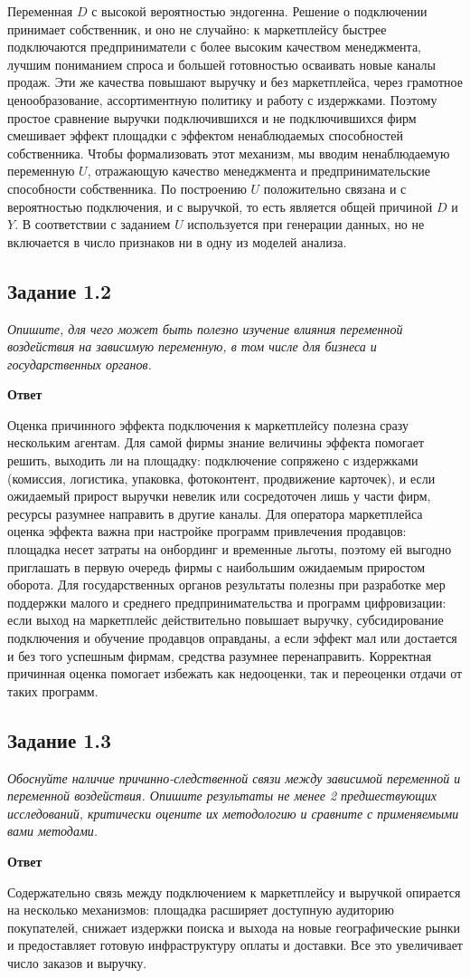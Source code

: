 \documentclass[12pt,a4paper]{article}
\newcommand{\zadanie}[2]{\subsection*{Задание #1}\begingroup\itshape #2\par\endgroup\medskip}
\newcommand{\otvet}{\par\noindent\textbf{Ответ}\par\medskip}
\begin{document}
Переменная $D$ с высокой вероятностью эндогенна. Решение о подключении принимает собственник, и оно не случайно: к маркетплейсу быстрее подключаются предприниматели с более высоким качеством менеджмента, лучшим пониманием спроса и большей готовностью осваивать новые каналы продаж. Эти же качества повышают выручку и без маркетплейса, через грамотное ценообразование, ассортиментную политику и работу с издержками. Поэтому простое сравнение выручки подключившихся и не подключившихся фирм смешивает эффект площадки с эффектом ненаблюдаемых способностей собственника. Чтобы формализовать этот механизм, мы вводим ненаблюдаемую переменную $U$, отражающую качество менеджмента и предпринимательские способности собственника. По построению $U$ положительно связана и с вероятностью подключения, и с выручкой, то есть является общей причиной $D$ и $Y$. В соответствии с заданием $U$ используется при генерации данных, но не включается в число признаков ни в одну из моделей анализа.

\zadanie{1.2}{Опишите, для чего может быть полезно изучение влияния переменной воздействия на зависимую переменную, в том числе для бизнеса и государственных органов.}
\otvet
Оценка причинного эффекта подключения к маркетплейсу полезна сразу нескольким агентам. Для самой фирмы знание величины эффекта помогает решить, выходить ли на площадку: подключение сопряжено с издержками (комиссия, логистика, упаковка, фотоконтент, продвижение карточек), и если ожидаемый прирост выручки невелик или сосредоточен лишь у части фирм, ресурсы разумнее направить в другие каналы. Для оператора маркетплейса оценка эффекта важна при настройке программ привлечения продавцов: площадка несет затраты на онбординг и временные льготы, поэтому ей выгодно приглашать в первую очередь фирмы с наибольшим ожидаемым приростом оборота. Для государственных органов результаты полезны при разработке мер поддержки малого и среднего предпринимательства и программ цифровизации: если выход на маркетплейс действительно повышает выручку, субсидирование подключения и обучение продавцов оправданы, а если эффект мал или достается и без того успешным фирмам, средства разумнее перенаправить. Корректная причинная оценка помогает избежать как недооценки, так и переоценки отдачи от таких программ.

\zadanie{1.3}{Обоснуйте наличие причинно-следственной связи между зависимой переменной и переменной воздействия. Опишите результаты не менее 2 предшествующих исследований, критически оцените их методологию и сравните с применяемыми вами методами.}
\otvet
Содержательно связь между подключением к маркетплейсу и выручкой опирается на несколько механизмов: площадка расширяет доступную аудиторию покупателей, снижает издержки поиска и выхода на новые географические рынки и предоставляет готовую инфраструктуру оплаты и доставки. Все это увеличивает число заказов и выручку.
\end{document}
